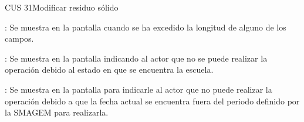 \begin{UseCase}{CUS 31}{Modificar residuo sólido}
{\begin{UClist}
	    \UCli {}: Se muestra en la pantalla  cuando se ha excedido la longitud de alguno de los campos.
	    
	    \UCli {}: Se muestra en la pantalla  indicando al actor que no se puede realizar la operación debido al estado en que se encuentra la escuela.
	    
	    \UCli {}: Se muestra en la pantalla  para indicarle al actor que no puede realizar la operación debido a que la fecha actual se encuentra fuera del periodo definido por la SMAGEM para realizarla.
	\end{UClist}
    }


\end{UseCase}

